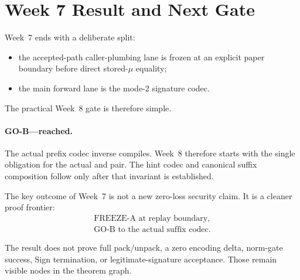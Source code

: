 \section{Week 7 Result and Next Gate}

Week~7 ends with a deliberate split:

\begin{itemize}
\item the accepted-path caller-plumbing lane is frozen at an explicit
paper boundary before direct stored-\(\mu\) equality;
\item the main forward lane is the mode-2 signature codec.
\end{itemize}

The practical Week~8 gate is therefore simple.

\paragraph{GO-B---reached.}
The actual prefix codec inverse compiles. Week~8 therefore starts with the
single obligation  for the actual
 and  pair. The
hint codec and canonical suffix composition follow only after that invariant
is established.

The key outcome of Week~7 is not a new zero-loss security claim. It is a
cleaner proof frontier:
\[
\begin{gathered}
  \text{FREEZE-A at replay boundary},\\
  \text{GO-B to the actual suffix codec.}
\end{gathered}
\]

The result does not prove full pack/unpack, a zero encoding delta, norm-gate
success, Sign termination, or legitimate-signature acceptance. Those remain
visible nodes in the theorem graph.
